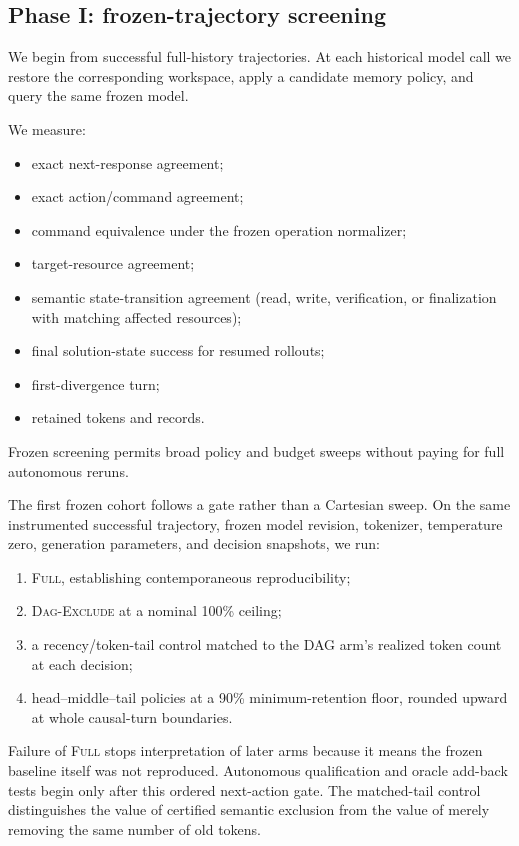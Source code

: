 \documentclass[11pt]{article}
\begin{document}
\subsection{Phase I: frozen-trajectory screening}

We begin from successful full-history trajectories. At each historical model
call we restore the corresponding workspace, apply a candidate memory policy,
and query the same frozen model.

We measure:
\begin{itemize}[leftmargin=*]
    \item exact next-response agreement;
    \item exact action/command agreement;
    \item command equivalence under the frozen operation normalizer;
    \item target-resource agreement;
    \item semantic state-transition agreement (read, write, verification, or
    finalization with matching affected resources);
    \item final solution-state success for resumed rollouts;
    \item first-divergence turn;
    \item retained tokens and records.
\end{itemize}

Frozen screening permits broad policy and budget sweeps without paying for full
autonomous reruns.

The first frozen cohort follows a gate rather than a Cartesian sweep. On the
same instrumented successful trajectory, frozen model revision, tokenizer,
temperature zero, generation parameters, and decision snapshots, we run:

\begin{enumerate}[leftmargin=*]
    \item \textsc{Full}, establishing contemporaneous reproducibility;
    \item \textsc{Dag-Exclude} at a nominal 100\% ceiling;
    \item a recency/token-tail control matched to the DAG arm's realized token
    count at each decision;
    \item head--middle--tail policies at a 90\% minimum-retention floor,
    rounded upward at whole causal-turn boundaries.
\end{enumerate}

Failure of \textsc{Full} stops interpretation of later arms because it means the
frozen baseline itself was not reproduced. Autonomous qualification and oracle
add-back tests begin only after this ordered next-action gate. The matched-tail
control distinguishes the value of certified semantic exclusion from the value
of merely removing the same number of old tokens.
\end{document}
